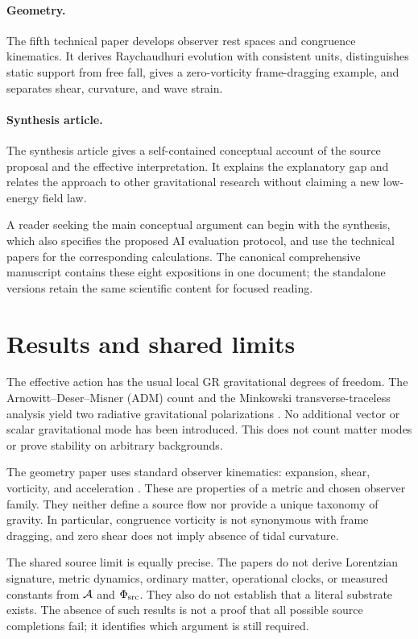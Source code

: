 \documentclass[11pt]{article}
\begin{document}
\paragraph{Geometry.} The fifth technical paper develops observer rest spaces and congruence kinematics. It derives Raychaudhuri evolution with consistent units, distinguishes static support from free fall, gives a zero-vorticity frame-dragging example, and separates shear, curvature, and wave strain.

\paragraph{Synthesis article.} The synthesis article gives a self-contained conceptual account of the source proposal and the effective interpretation. It explains the explanatory gap and relates the approach to other gravitational research without claiming a new low-energy field law.

A reader seeking the main conceptual argument can begin with the synthesis, which also specifies the proposed AI evaluation protocol, and use the technical papers for the corresponding calculations. The canonical comprehensive manuscript contains these eight expositions in one document; the standalone versions retain the same scientific content for focused reading.

\section{Results and shared limits}
The effective action has the usual local GR gravitational degrees of freedom. The Arnowitt--Deser--Misner (ADM) count and the Minkowski transverse-traceless analysis yield two radiative gravitational polarizations \parencite{ADM1962}. No additional \Aflow{} vector or scalar gravitational mode has been introduced. This does not count matter modes or prove stability on arbitrary backgrounds.

The geometry paper uses standard observer kinematics: expansion, shear, vorticity, and acceleration \parencite{EllisVanElst1999}. These are properties of a metric and chosen observer family. They neither define a source flow nor provide a unique taxonomy of gravity. In particular, congruence vorticity is not synonymous with frame dragging, and zero shear does not imply absence of tidal curvature.

The shared source limit is equally precise. The papers do not derive Lorentzian signature, metric dynamics, ordinary matter, operational clocks, or measured constants from $\mathcal A$ and $\Phi_{\mathrm{src}}$. They also do not establish that a literal substrate exists. The absence of such results is not a proof that all possible source completions fail; it identifies which argument is still required.
\end{document}
